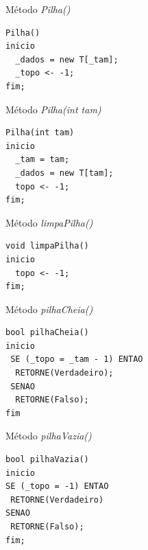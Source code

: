 \documentclass[12pt,table,xcolor={dvipsnames}]{beamer}
\begin{document}
\begin{frame}[fragile]{Método \textit{Pilha()}}
\begin{lstlisting}
Pilha()
inicio
  _dados = new T[_tam];
  _topo <- -1;
fim;
\end{lstlisting}
\end{frame}

\begin{frame}[fragile]{Método \textit{Pilha(int tam)}}
\begin{lstlisting}
Pilha(int tam)
inicio
  _tam = tam;
  _dados = new T[tam];
  topo <- -1;
fim;
\end{lstlisting}
\end{frame}

\begin{frame}[fragile]{Método \textit{limpaPilha()}}
\begin{lstlisting}
void limpaPilha()
inicio
  topo <- -1;
fim;
\end{lstlisting}
\end{frame}

\begin{frame}[fragile]{Método \textit{pilhaCheia()}}
\begin{lstlisting}
bool pilhaCheia()
inicio
 SE (_topo = _tam - 1) ENTAO
  RETORNE(Verdadeiro);
 SENAO
  RETORNE(Falso);
fim
\end{lstlisting}
\end{frame}

\begin{frame}[fragile]{Método \textit{pilhaVazia()}}
\begin{lstlisting}
bool pilhaVazia()
inicio
SE (_topo = -1) ENTAO
 RETORNE(Verdadeiro)
SENAO
 RETORNE(Falso);
fim;
\end{lstlisting}
\end{frame}
\end{document}
